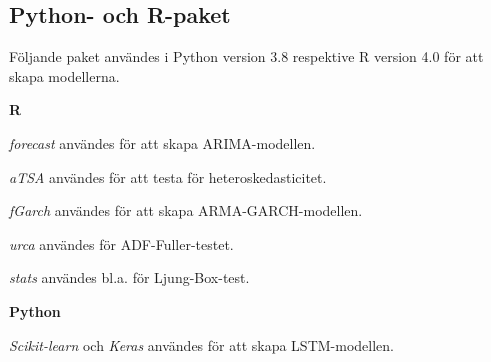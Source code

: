 \documentclass[11pt]{article}
\numberwithin{equation}{section}
\numberwithin{table}{section}
\numberwithin{figure}{section}
\begin{document}
\subsection{Python- och R-paket}
Följande paket användes i Python version 3.8 respektive R version 4.0 för att skapa modellerna. 

\textbf{R} \par
\textit{forecast} användes för att skapa ARIMA-modellen. \par
\textit{aTSA} användes för att testa för heteroskedasticitet. \par
\textit{fGarch} användes för att skapa ARMA-GARCH-modellen. \par
\textit{urca} användes för ADF-Fuller-testet. \par
\textit{stats} användes bl.a. för Ljung-Box-test. \par

\textbf{Python} \par
\textit{Scikit-learn} och \textit{Keras} användes för att skapa LSTM-modellen.
\end{document}
